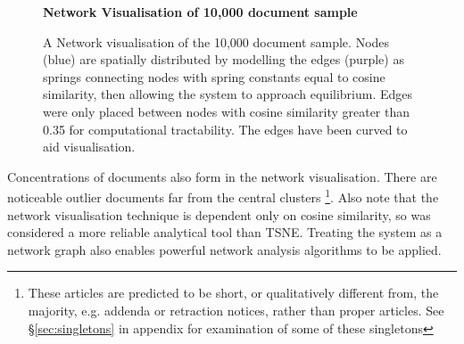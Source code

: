 \begin{center}
\begin{figure}[H]
  \centering
  \textbf{Network Visualisation of 10,000 document sample}
    \caption[Network Visualisation of 10,000 document random sample]{A Network visualisation of the 10,000 document sample. Nodes (blue) are spatially distributed by modelling the edges (purple) as springs connecting nodes with spring constants equal to cosine similarity, then allowing the system to approach equilibrium. Edges were only placed between nodes with cosine similarity greater than 0.35 for computational tractability. The edges have been curved to aid visualisation.}
    \label{fig:gephi_exp}

\end{figure} 
\end{center}
Concentrations of documents also form in the network visualisation. There are noticeable outlier documents far from the central clusters \footnote{These articles are predicted to be short, or qualitatively different from, the majority, e.g. addenda or retraction notices, rather than proper articles. See \S\ref{sec:singletons} in appendix for examination of some of these singletons}. Also note that the network visualisation technique is dependent only on cosine similarity, so was considered a more reliable analytical tool than TSNE. Treating the system as a network graph also enables powerful network analysis algorithms to be applied.